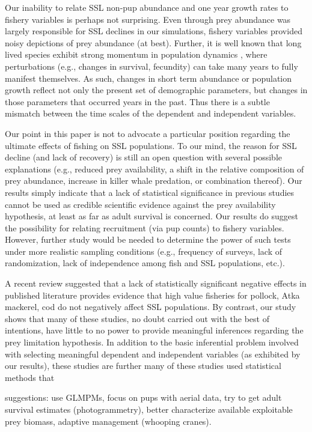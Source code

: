 \documentclass[nonumbib,leqno]{nrc1}
\begin{document}
Our inability to relate SSL non-pup abundance and one year growth rates to fishery variables is perhaps not surprising.  Even through prey abundance was largely responsible for SSL declines in our simulations, fishery variables provided noisy depictions of prey abundance (at best).  Further, it is well known that long lived species exhibit strong momentum in population dynamics \citep[see][for a review]{EzardEtAl2010}, where perturbations (e.g., changes in survival, fecundity) can take many years to fully manifest themselves.  As such, changes in short term abundance or population growth reflect not only the present set of demographic parameters, but changes in those parameters that occurred years in the past.  Thus there is a subtle mismatch between the time scales of the dependent and independent variables.

Our point in this paper is not to advocate a particular position regarding the ultimate effects of fishing on SSL populations.  To our mind, the reason for SSL decline (and lack of recovery) is still an open question with several possible explanations (e.g., reduced prey availability, a shift in the relative composition of prey abundance, increase in killer whale predation, or combination thereof).  Our results simply indicate that a lack of statistical significance in previous studies cannot be used as credible scientific evidence against the prey availability hypothesis, at least as far as adult survival is concerned.  Our results do suggest the possibility for relating recruitment (via pup counts) to fishery variables.  However, further study would be needed to determine the power of such tests under more realistic sampling conditions (e.g., frequency of surveys, lack of randomization, lack of independence among fish and SSL populations, etc.).

A recent review \citep{Bernard:2011dq} suggested that a lack of statistically significant negative effects in published literature provides evidence that high value fisheries for pollock, Atka mackerel, cod do not negatively affect SSL populations.  By contrast, our study shows that many of these studies, no doubt carried out with the best of intentions, have little to no power to provide meaningful inferences regarding the prey limitation hypothesis.  In addition to the basic inferential problem involved with selecting meaningful dependent and independent variables (as exhibited by our results), these studies are further many of these studies used statistical methods that

suggestions: use GLMPMs, focus on pups with aerial data, try to get adult survival estimates (photogrammetry), better characterize available exploitable prey biomass, adaptive management (whooping cranes).
\end{document}
